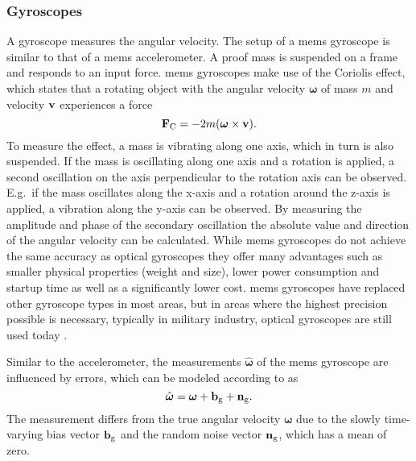 \subsubsection{ Gyroscopes}
A gyroscope measures the angular velocity.
The setup of a \gls{mems} gyroscope is similar to that of a \gls{mems} accelerometer.
A proof mass is suspended on a frame and responds to an input force.
\gls{mems} gyroscopes make use of the Coriolis effect, which states that a rotating object with the angular velocity $\boldsymbol{\omega}$ of mass $m$ and velocity $\vb{v}$ experiences a force
\begin{equation}
	\vb{F}_\mathrm{C}  = -2m(\boldsymbol{\omega}\times \vb{v}).
\end{equation}
To measure the effect, a mass is vibrating along one axis, which in turn is also suspended.
If the mass is oscillating along one axis and a rotation is applied, a second oscillation on the axis perpendicular to the rotation axis can be observed.
E.g.\ if the mass oscillates along the x-axis and a rotation around the z-axis is applied, a vibration along the y-axis can be observed.
By measuring the amplitude and phase of the secondary oscillation the absolute value and direction of the angular velocity can be calculated.
While \gls{mems} gyroscopes do not achieve the same accuracy as optical gyroscopes they offer many advantages such as smaller physical properties (weight and size), lower power consumption and startup time as well as a significantly lower cost.
\gls{mems} gyroscopes have replaced other gyroscope types in most areas, but in areas where the highest precision possible is necessary, typically in military industry, optical gyroscopes are still used today \cite{Perlmutter2016}.\par
Similar to the accelerometer, the measurements $\hat{\boldsymbol{\omega}}$ of the \gls{mems} gyroscope are influenced by errors, which can be modeled according to \cite{Lefferts1982} as
\begin{equation}
	\hat{\boldsymbol{\omega}} = \boldsymbol{\omega} + \vb{b}_\mathrm{g} + \vb{n}_\mathrm{g}.
\end{equation}
The measurement differs from the true angular velocity $\boldsymbol{\omega}$ due to the slowly time-varying bias vector $\vb{b}_\mathrm{g}$ and the random noise vector $\vb{n}_\mathrm{g}$, which has a mean of zero.

